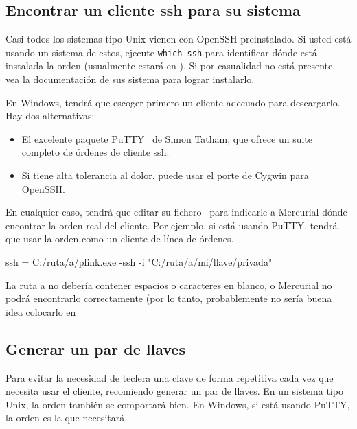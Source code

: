 \subsection{Encontrar un cliente ssh para su sistema}

Casi todos los sistemas tipo Unix vienen con OpenSSH preinstalado.  Si
usted está usando un sistema de estos, ejecute \Verb|which ssh| para
identificar dónde está instalada la orden  (usualmente
estará en ).  Si por casualidad no está presente,
vea la documentación de sus sistema para lograr instalarlo.

En Windows, tendrá que escoger primero un cliente adecuado para
descargarlo.  Hay dos alternativas:
\begin{itemize}
\item El excelente paquete PuTTY~\cite{web:putty} de Simon Tatham, que
  ofrece un suite completo de órdenes de cliente ssh.
\item Si tiene alta tolerancia al dolor, puede usar el porte de Cygwin
  para OpenSSH.
\end{itemize}
En cualquier caso, tendrá que editar su fichero \hgini\ para indicarle
a Mercurial dónde encontrar la orden real del cliente.  Por ejemplo, si
está usando PuTTY, tendrá que usar la orden  como un
cliente de línea de órdenes.
\begin{codesample2}
  [ui]
  ssh = C:/ruta/a/plink.exe -ssh -i "C:/ruta/a/mi/llave/privada"
\end{codesample2}

\begin{note}
  La ruta a  no debería contener espacios o caracteres
  en blanco, o Mercurial no podrá encontrarlo correctamente (por lo
  tanto, probablemente no sería buena idea colocarlo en 
\end{note}

\subsection{Generar un par de llaves}

Para evitar la necesidad de teclera una clave de forma repetitiva cada
vez que necesita usar el cliente, recomiendo generar un par de llaves.
En un sistema tipo Unix, la orden  también se
comportará bien. En Windows, si está usando PuTTY, la orden
 es la que necesitará.

